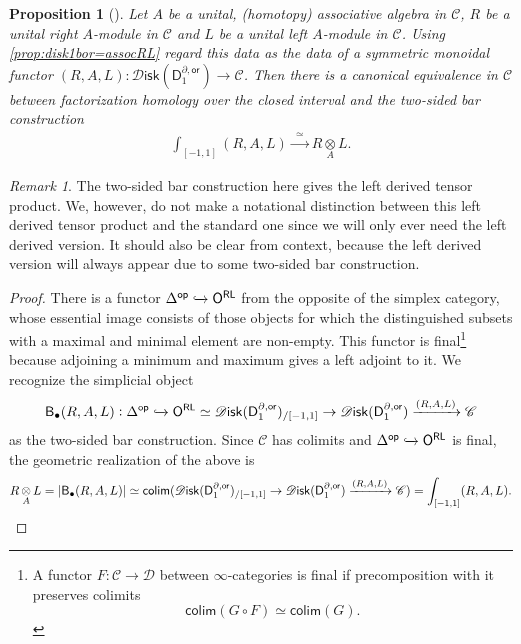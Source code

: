 \documentclass[12pt,a4paper]{article}
\newcounter{counter} \numberwithin{counter}{section}
\theoremstyle{definition}
\theoremstyle{plain}
\newtheorem{proposition}[counter]{Proposition}
\theoremstyle{remark}
\newtheorem{remark}[counter]{Remark}
\newcommand{\catC}{\mathscr{C}}
\newcommand{\disk}{\mathscr{D} \mathsf{isk}}
\begin{document}
\begin{proposition}[{\cite[prop.2.34]{aft_fhstrat}}]\label{prop:barconst=intinterval}
    Let $A$ be a unital, (homotopy) associative algebra in $\catC$, $R$ be a unital right $A$-module in $\catC$ and $L$ be a unital left $A$-module in $\catC$. Using \cref{prop:disk1bor=assocRL} regard this data as the data of a symmetric monoidal functor $(R, A, L): \disk (\mathsf{D}_1^{\partial, \mathsf{or}}) \rightarrow \catC$. Then there is a canonical equivalence in $\catC$ between factorization homology over the closed interval and the two-sided bar construction
    \begin{align}
        \int_{[-1,1]} (R, A, L) \xrightarrow{\ \ \simeq \ \ } R \mathop\otimes\limits_{A} L.
    \end{align}
\end{proposition}

\begin{remark}
    The two-sided bar construction here gives the left derived tensor product. We, however, do not make a notational distinction between this left derived tensor product and the standard one since we will only ever need the left derived version. It should also be clear from context, because the left derived version will always appear due to some two-sided bar construction. 
\end{remark}

\begin{proof}
    There is a functor $\Delta^{\mathsf{op}} \xhookrightarrow{} \mathsf{O^{RL}}$ from the opposite of the simplex category, whose essential image consists of those objects for which the distinguished subsets with a maximal and minimal element are non-empty. This functor is final\footnote{A functor $F: \catC \rightarrow \mathscr{D}$ between $\infty$-categories is final if precomposition with it preserves colimits \[ \mathsf{colim}(G \circ F) \simeq \mathsf{colim}(G).\]} because adjoining a minimum and maximum gives a left adjoint to it. We recognize the simplicial object
    \begin{align}
        \mathsf{B}_{\bullet}(R, A, L): \Delta^{\mathsf{op}} \xhookrightarrow{} \mathsf{O^{RL}} \simeq \disk (\mathsf{D}_1^{\partial, \mathsf{or}})_{/[-1,1]} \rightarrow \disk (\mathsf{D}_1^{\partial, \mathsf{or}}) \xrightarrow{(R, A, L)} \catC
    \end{align}
    as the two-sided bar construction. Since $\catC$ has colimits and $\Delta^{\mathsf{op}} \xhookrightarrow{} \mathsf{O^{RL}}$ is final, the geometric realization of the above is
    \begin{align}
        R \mathop\otimes\limits_{A} L = |\mathsf{B}_{\bullet}(R, A, L)| \simeq \mathsf{colim} (\disk (\mathsf{D}_1^{\partial, \mathsf{or}})_{/[-1,1]} \rightarrow \disk (\mathsf{D}_1^{\partial, \mathsf{or}}) \xrightarrow{(R, A, L)} \catC) = \int_{[-1,1]} (R, A, L). \notag
    \end{align}
\end{proof}
\end{document}
